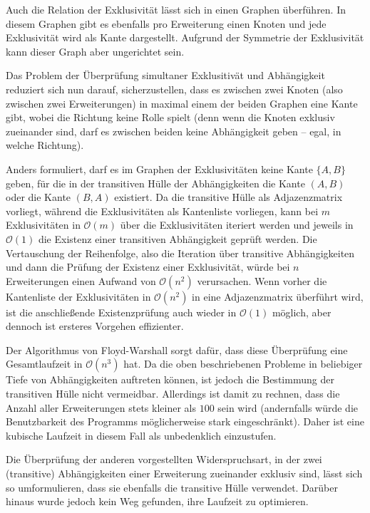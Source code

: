 Auch die Relation der Exklusivität lässt sich in einen Graphen überführen. In diesem Graphen gibt es ebenfalls pro Erweiterung einen Knoten und jede Exklusivität wird als Kante dargestellt. Aufgrund der Symmetrie der Exklusivität kann dieser Graph aber ungerichtet sein.

Das Problem der Überprüfung simultaner Exklusitivät und Abhängigkeit reduziert sich nun darauf, sicherzustellen, dass es zwischen zwei Knoten (also zwischen zwei Erweiterungen) in maximal einem der beiden Graphen eine Kante gibt, wobei die Richtung keine Rolle spielt (denn wenn die Knoten exklusiv zueinander sind, darf es zwischen beiden keine Abhängigkeit geben -- egal, in welche Richtung).

Anders formuliert, darf es im Graphen der Exklusivitäten keine Kante $\{A, B\}$ geben, für die in der transitiven Hülle der Abhängigkeiten die Kante $(A, B)$ oder die Kante $(B, A)$ existiert. Da die transitive Hülle als Adjazenzmatrix vorliegt, während die Exklusivitäten als Kantenliste vorliegen, kann bei $m$ Exklusivitäten in $\mathcal{O}(m)$ über die Exklusivitäten iteriert werden und jeweils in $\mathcal{O}(1)$ die Existenz einer transitiven Abhängigkeit geprüft werden. Die Vertauschung der Reihenfolge, also die Iteration über transitive Abhängigkeiten und dann die Prüfung der Existenz einer Exklusivität, würde bei $n$ Erweiterungen einen Aufwand von $\mathcal{O}(n^2)$ verursachen. Wenn vorher die Kantenliste der Exklusivitäten in $\mathcal{O}(n^2)$ in eine Adjazenzmatrix überführt wird, ist die anschließende Existenzprüfung auch wieder in $\mathcal{O}(1)$ möglich, aber dennoch ist ersteres Vorgehen effizienter.

Der Algorithmus von Floyd-Warshall sorgt dafür, dass diese Überprüfung eine Gesamtlaufzeit in $\mathcal{O}(n^3)$ hat. Da die oben beschriebenen Probleme in beliebiger Tiefe von Abhängigkeiten auftreten können, ist jedoch die Bestimmung der transitiven Hülle nicht vermeidbar. Allerdings ist damit zu rechnen, dass die Anzahl aller Erweiterungen stets kleiner als $100$ sein wird (andernfalls würde die Benutzbarkeit des Programms möglicherweise stark eingeschränkt). Daher ist eine kubische Laufzeit in diesem Fall als unbedenklich einzustufen.

Die Überprüfung der anderen vorgestellten Widerspruchsart, in der zwei (transitive) Abhängigkeiten einer Erweiterung zueinander exklusiv sind, lässt sich so umformulieren, dass sie ebenfalls die transitive Hülle verwendet. Darüber hinaus wurde jedoch kein Weg gefunden, ihre Laufzeit zu optimieren.

